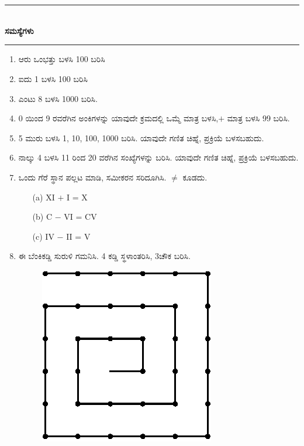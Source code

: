 \chapter[ಅಧ್ಯಾಯ 12]{}\label{chap12}

\begin{center}
\rule{5cm}{1pt}\\[5pt]
{\Large\bfseries ಸಮಸ್ಯೆಗಳು}\\[3pt]
\rule{5cm}{1pt}
\end{center}

\begin{enumerate}
\renewcommand{\labelenumi}{\bf\theenumi.}
\itemsep=5pt

\item ಆರು ಒಂಭತ್ತು ಬಳಸಿ 100 ಬರಿಸಿ 

\item ಐದು 1 ಬಳಸಿ 100 ಬರಿಸಿ

\item ಎಂಟು 8 ಬಳಸಿ 1000 ಬರಿಸಿ. 

\item 0 ಯಿಂದ 9 ರವರೆಗಿನ ಅಂಕಿಗಳನ್ನು ಯಾವುದೇ ಕ್ರಮದಲ್ಲಿ ಒಮ್ಮೆ ಮಾತ್ರ ಬಳಸಿ,\break $+$ ಮಾತ್ರ ಬಳಸಿ 99 ಬರಿಸಿ. 

\item 5 ಮುರು ಬಳಸಿ 1, 10, 100, 1000 ಬರಿಸಿ. ಯಾವುದೇ ಗಣಿತ ಚಿಹ್ನೆ, ಪ್ರಕ್ರಿಯೆ ಬಳಸಬಹುದು. 

\item ನಾಲ್ಕು 4 ಬಳಸಿ 11 ರಿಂದ 20 ವರೆಗಿನ ಸಂಖ್ಯೆಗಳನ್ನು ಬರಿಸಿ. ಯಾವುದೇ ಗಣಿತ ಚಿಹ್ನೆ, ಪ್ರಕ್ರಿಯೆ ಬಳಸಬಹುದು. 

\item ಒಂದು ಗೆರೆ ಸ್ಥಾನ ಪಲ್ಲಟ ಮಾಡಿ, ಸಮೀಕರನ ಸರಿದೂಗಿಸಿ. $\neq$ ಕೂಡದು. 
\begin{itemize}
\item[(a)] XI $+$ I = X
\item[(b)] C $-$ VI = CV
\item[(c)] IV $-$ II = V
\end{itemize}

\eject

\item ಈ ಬೆಂಕಿಕಡ್ಡಿ ಸುರುಳಿ ಗಮನಿಸಿ. 4 ಕಡ್ಡಿ ಸ್ಥಳಾಂತರಿಸಿ, 3ಚೌಕ ಬರಿಸಿ. 
\begin{figure}[H]
\centering
\includegraphics{images/chap12/q8.eps}
\end{figure}


\end{enumerate}

